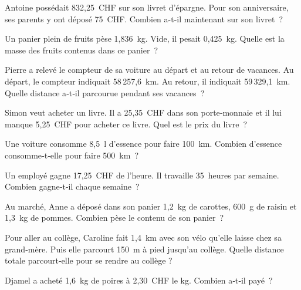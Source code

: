 \begin{exercice}
Antoine possédait 832,25 CHF sur son livret d'épargne. Pour son anniversaire, ses parents y ont déposé 75 CHF. Combien a-t-il maintenant sur son livret ?
\end{exercice}


\begin{exercice}
Un panier plein de fruits pèse 1,836 kg. Vide, il pesait 0,425 kg. Quelle est la masse des fruits contenus dans ce panier ?
\end{exercice}


\begin{exercice}
Pierre a relevé le compteur de sa voiture au départ et au retour de vacances. Au départ, le compteur indiquait 58\,257,6 km. Au retour, il indiquait 59\,329,1 km. Quelle distance a‑t‑il parcourue pendant ses vacances ?
\end{exercice}


\begin{exercice}
Simon veut acheter un livre. Il a 25,35 CHF dans son porte‑monnaie et il lui manque 5,25 CHF pour acheter ce livre. Quel est le prix du livre ?
\end{exercice}


\begin{exercice}
Une voiture consomme 8,5 l d'essence pour faire 100 km. Combien d'essence consomme‑t‑elle pour faire 500 km ?
\end{exercice}
  
  
\begin{exercice}
Un employé gagne 17,25 CHF de l'heure. Il travaille 35 heures par semaine. Combien gagne‑t‑il chaque semaine ?
\end{exercice}


\begin{exercice}
Au marché, Anne a déposé dans son panier 1,2 kg de carottes, 600 g de raisin et 1,3 kg de pommes. Combien pèse le contenu de son panier ?
\end{exercice}


\begin{exercice}
Pour aller au collège, Caroline fait 1,4 km avec son vélo qu'elle laisse chez sa grand‑mère. Puis elle parcourt 150 m à pied jusqu'au collège. Quelle distance totale parcourt‑elle pour se rendre au collège ?
\end{exercice}


\begin{exercice}
Djamel a acheté 1,6 kg de poires à 2,30 CHF le kg. Combien a‑t‑il payé ?
\end{exercice}


